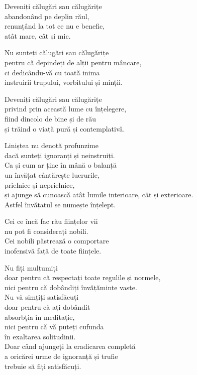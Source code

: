 Deveniți călugări sau călugărițe\\
abandonând pe deplin răul,\\
renunțând la tot ce nu e benefic,\\
atât mare, cât și mic.


Nu sunteți călugări sau călugărițe\\
pentru că depindeți de alții pentru mâncare,\\
ci dedicându-vă cu toată inima\\
instruirii trupului, vorbitului și minții.


Deveniți călugări sau călugărițe\\
privind prin această lume cu înțelegere,\\
fiind dincolo de bine și de rău\\
și trăind o viață pură și contemplativă.


Liniștea nu denotă profunzime\\
dacă sunteți ignoranți și neinstruiți.\\
Ca și cum ar ține în mână o balanță\\
un învățat cântărește lucrurile,\\
prielnice și neprielnice,\\
și ajunge să cunoască atât lumile interioare, cât și exterioare.\\
Astfel învățatul se numește înțelept.


Cei ce încă fac rău ființelor vii\\
nu pot fi considerați nobili.\\
Cei nobili păstrează o comportare\\
inofensivă față de toate ființele.


Nu fiți mulțumiți\\
doar pentru că respectați toate regulile și normele,\\
nici pentru că dobândiți învățăminte vaste.\\
Nu vă simțiți satisfăcuți\\
doar pentru că ați dobândit\\
absorbția în meditație,\\
nici pentru că vă puteți cufunda\\
în exaltarea solitudinii.\\
Doar când ajungeți la eradicarea completă\\
a oricărei urme de ignoranță și trufie\\
trebuie să fiți satisfăcuți.
